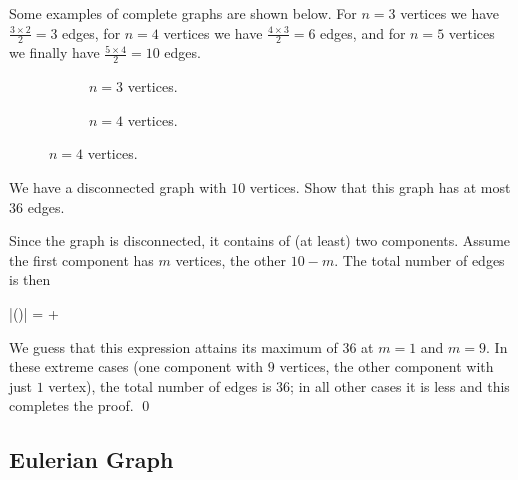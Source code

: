 Some examples of complete graphs are shown below. For $n=3$ vertices we have $\frac{3 \times 2}{2} = 3$ edges, for $n=4$ vertices we have $\frac{4 \times 3}{2} = 6$ edges, and for $n=5$ vertices we finally have $\frac{5 \times 4}{2} = 10$ edges.

\begin{figure}[H]

\begin{subfigure}{0.4\textwidth}
\caption{$n=3$ vertices.}
\end{subfigure}
\qquad %
\begin{subfigure}{0.4\textwidth}
\caption{$n=4$ vertices.}
\end{subfigure}
\end{figure}



\begin{problem}
We have a disconnected graph with $10$ vertices. Show that this graph has at most $36$ edges.
\end{problem}

Since the graph is disconnected, it contains of (at least) two components. Assume the first component has $m$ vertices, the other $10 - m$. The total number of edges is then

\bee
|\Ec(\Gc)| =  + 
\eee

We guess that this expression attains its maximum of $36$ at $m=1$ and $m=9$. In these extreme cases (one component with $9$ vertices, the other component with just $1$ vertex), the total number of edges is $36$; in all other cases it is less and this completes the proof. \qed 



\subsection{Eulerian Graph}

